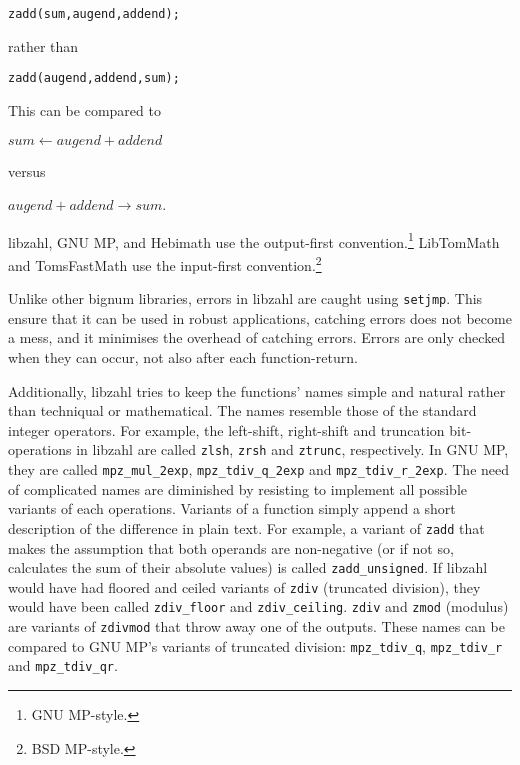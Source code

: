 \begin{alltt}
   zadd(sum, augend, addend);
\end{alltt}

\noindent
rather than

\begin{alltt}
   zadd(augend, addend, sum);
\end{alltt}

\noindent
This can be compared to

\vspace{1em}
$sum \gets augend + addend$
\vspace{1em}

\noindent
versus

\vspace{1em}
$augend + addend \rightarrow sum$.
\vspace{1em}

libzahl, GNU MP, and Hebimath use the output-first
convention.\footnote{GNU MP-style.} LibTomMath and
TomsFastMath use the input-first convention.\footnote{BSD
MP-style.}

Unlike other bignum libraries, errors in libzahl are
caught using {\tt setjmp}. This ensure that it can be
used in robust applications, catching errors does not
become a mess, and it minimises the overhead of
catching errors. Errors are only checked when they can
occur, not also after each function-return.

Additionally, libzahl tries to keep the functions'
names simple and natural rather than techniqual or
mathematical. The names resemble those of the standard
integer operators. For example, the left-shift, right-shift
and truncation bit-operations in libzahl are called
{\tt zlsh}, {\tt zrsh} and {\tt ztrunc}, respectively.
In GNU MP, they are called {\tt mpz\_mul\_2exp},
{\tt mpz\_tdiv\_q\_2exp} and {\tt mpz\_tdiv\_r\_2exp}.
The need of complicated names are diminished by resisting
to implement all possible variants of each operations.
Variants of a function simply append a short description
of the difference in plain text. For example, a variant of
{\tt zadd} that makes the assumption that both operands
are non-negative (or if not so, calculates the sum of
their absolute values) is called {\tt zadd\_unsigned}.
If libzahl would have had floored and ceiled variants of
{\tt zdiv} (truncated division), they would have been
called {\tt zdiv\_floor} and {\tt zdiv\_ceiling}.
{\tt zdiv} and {\tt zmod} (modulus) are variants of
{\tt zdivmod} that throw away one of the outputs. These
names can be compared to GNU MP's variants of truncated
division: {\tt mpz\_tdiv\_q}, {\tt mpz\_tdiv\_r} and
{\tt mpz\_tdiv\_qr}.


